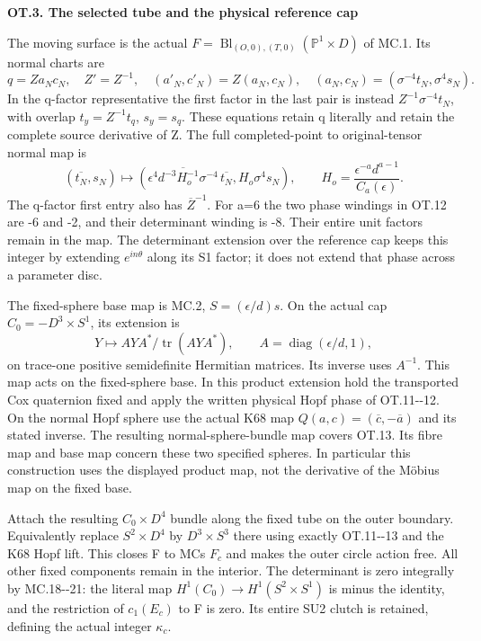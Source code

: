 \par

\medskip\noindent\textbf{OT.3. The selected tube and the physical reference cap}

\par\nobreak

The moving surface is the actual
\(F=\operatorname{Bl}_{(O,0),(T,0)}(\mathbb P^1\times D)\)
of MC.1. Its normal charts are
\[
q=Za_Nc_N,\quad Z'=Z^{-1},\quad (a'_N,c'_N)=Z(a_N,c_N),
\quad (a_N,c_N)=(\sigma^{-4}t_N,\sigma^4s_N).
                                                               \tag{OT.11}
\]
In the q-factor representative the first factor in the last
pair is instead \(Z^{-1}\sigma^{-4}t_N\), with overlap
\(t_y=Z^{-1}t_q\), \(s_y=s_q\). These equations retain q
literally and retain the complete source derivative of Z.
The full completed-point to original-tensor normal map is
\[
(\overline{t_N},s_N)\longmapsto
\left(
 \overline{\epsilon^4d^{-3}H_o^{-1}\sigma^{-4}}\,
          \overline{t_N},
 H_o\sigma^4s_N
\right),\qquad
H_o=\frac{\epsilon^{-a}d^{a-1}}{C_a(\epsilon)}.          \tag{OT.12}
\]
The q-factor first entry also has \(\overline Z^{-1}\).
For a=6 the two phase windings in OT.12 are -6 and -2,
and their determinant winding is -8. Their entire unit factors
remain in the map. The determinant extension over the reference
cap keeps this integer by extending \(e^{in\theta}\) along its
S1 factor; it does not extend that phase across a parameter disc.

The fixed-sphere base map is MC.2, \(S=(\epsilon/d)s\).
On the actual cap \(C_0=-D^3\times S^1\), its extension is
\[
Y\longmapsto AYA^*/\operatorname{tr}(AYA^*),\qquad
A=\operatorname{diag}(\epsilon/d,1),                  \tag{OT.13}
\]
on trace-one positive semidefinite Hermitian matrices. Its inverse
uses \(A^{-1}\). This map acts on the fixed-sphere base. In this
product extension hold the transported Cox quaternion fixed and
apply the written physical Hopf phase of OT.11-\/-12. On the normal
Hopf sphere use the actual K68 map
\(Q(a,c)=(\overline c,-\overline a)\) and its stated inverse.
The resulting normal-sphere-bundle map covers OT.13. Its fibre
map and base map concern these two specified spheres. In
particular this construction uses the displayed product map,
not the derivative of the Möbius map on the fixed base.

Attach the resulting \(C_0\times D^4\) bundle along the fixed
tube on the outer boundary. Equivalently replace
\(S^2\times D^4\) by \(D^3\times S^3\) there using exactly
OT.11-\/-13 and the K68 Hopf lift. This closes F to MC\textquotesingle s \(F_c\)
and makes the outer circle action free. All other fixed components
remain in the interior. The determinant is zero integrally by
MC.18-\/-21: the literal map
\(H^1(C_0)\to H^1(S^2\times S^1)\) is minus the identity,
and the restriction of \(c_1(E_c)\) to F is zero. Its entire
SU2 clutch is retained, defining the actual integer \(\kappa_c\).

